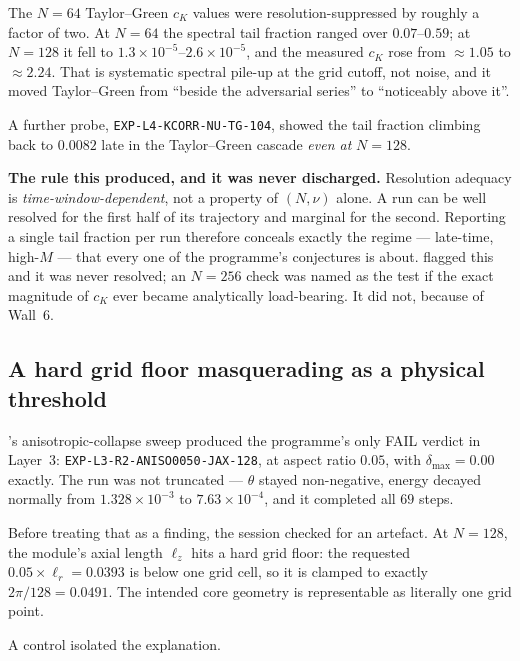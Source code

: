 The \(N=64\) Taylor--Green \(c_K\) values were resolution-suppressed by
roughly a factor of two. At \(N=64\) the spectral tail fraction ranged over
\(0.07\)--\(0.59\); at \(N=128\) it fell to
\(1.3\times10^{-5}\)--\(2.6\times10^{-5}\), and the measured \(c_K\) rose from
\(\approx1.05\) to \(\approx2.24\). That is systematic spectral pile-up at the
grid cutoff, not noise, and it moved Taylor--Green from ``beside the
adversarial series'' to ``noticeably above it''.

A further probe, \texttt{EXP-L4-KCORR-NU-TG-104}, showed the tail fraction
climbing back to \(0.0082\) late in the Taylor--Green cascade \emph{even at}
\(N=128\).

\begin{record}
\textbf{The rule this produced, and it was never discharged.} Resolution
adequacy is \emph{time-window-dependent}, not a property of \((N,\nu)\) alone.
A run can be well resolved for the first half of its trajectory and marginal
for the second. Reporting a single tail fraction per run therefore conceals
exactly the regime --- late-time, high-\(M\) --- that every one of the
programme's conjectures is about.  flagged this and it was never
resolved; an \(N=256\) check was named as the test if the exact magnitude of
\(c_K\) ever became analytically load-bearing. It did not, because of Wall~6.
\end{record}

\subsection{A hard grid floor masquerading as a physical threshold}

's anisotropic-collapse sweep produced the programme's only \textsf{FAIL}
verdict in Layer~3: \texttt{EXP-L3-R2-ANISO0050-JAX-128}, at aspect ratio
\(0.05\), with \(\delta_{\max}=0.00\) exactly. The run was not truncated ---
\(\theta\) stayed non-negative, energy decayed normally from
\(1.328\times10^{-3}\) to \(7.63\times10^{-4}\), and it completed all \(69\)
steps.

Before treating that as a finding, the session checked for an artefact. At
\(N=128\), the module's axial length \(\ell_z\) hits a hard grid floor: the
requested \(0.05\times\ell_r=0.0393\) is below one grid cell, so it is clamped
to exactly \(2\pi/128=0.0491\). The intended core geometry is representable as
literally one grid point.

A control isolated the explanation.

